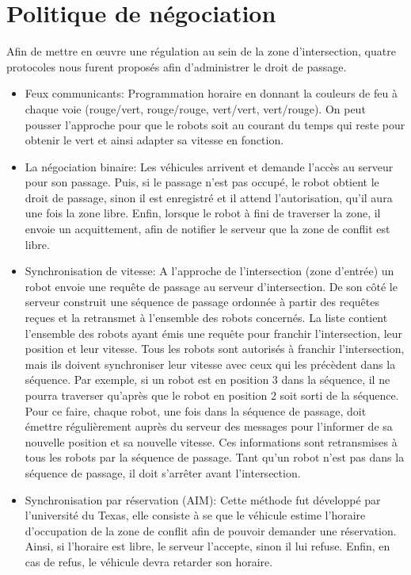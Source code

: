 \documentclass[french,a4paper,12pt]{report}
\begin{document}
\chapter{Politique de négociation}
Afin de mettre en œuvre une régulation au sein de la zone d'intersection, quatre protocoles nous furent proposés
afin d'administrer le droit de passage.

\begin{itemize}
\item Feux communicants:
Programmation horaire en donnant la couleurs de feu à chaque voie (rouge/vert, rouge/rouge, vert/vert, vert/rouge).
On peut pousser l'approche pour que le robots soit au courant du temps qui reste pour obtenir le vert et ainsi adapter sa vitesse en fonction.

\item La négociation binaire:
Les véhicules arrivent et demande l'accès au serveur pour son passage.
Puis, si le passage n'est pas occupé, le robot obtient le droit de passage, sinon il est enregistré et il attend l'autorisation, qu'il aura une fois la zone libre.
Enfin, lorsque le robot à fini de traverser la zone, il envoie un acquittement, afin de notifier le serveur que la zone de conflit est libre.

\item Synchronisation de vitesse:
A l’approche de l’intersection (zone d’entrée) un robot envoie une requête de passage au serveur d’intersection.
De son côté le serveur construit une séquence de passage ordonnée à partir des requêtes reçues et la retransmet
à l’ensemble des robots concernés. La liste contient l’ensemble des robots ayant émis une requête pour franchir
l’intersection, leur position et leur vitesse. Tous les robots sont autorisés à franchir l’intersection, mais ils doivent synchroniser leur vitesse avec ceux qui les précèdent dans la séquence. Par exemple, si un robot est en position 3 dans la séquence, il ne pourra traverser qu’après que le robot en position 2 soit sorti de la séquence. Pour ce faire, chaque robot, une fois dans la séquence de passage, doit émettre régulièrement auprès du serveur des messages pour l’informer de sa nouvelle position et sa nouvelle vitesse. Ces informations sont retransmises à
tous les robots par la séquence de passage. Tant qu’un robot n’est pas dans la séquence de passage, il doit s’arrêter avant l’intersection.

\item Synchronisation par réservation (AIM):
Cette méthode fut développé par l'université du Texas, elle consiste à se que le véhicule estime l'horaire d'occupation de la zone de conflit afin de pouvoir demander une réservation.
Ainsi, si l'horaire est libre, le serveur l'accepte, sinon il lui refuse.
Enfin, en cas de refus, le véhicule devra retarder son horaire.
\end{itemize}
\end{document}
